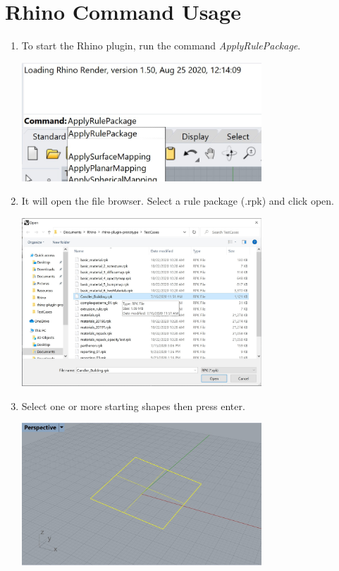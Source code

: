 \section{Rhino Command Usage}

\begin{enumerate}
    \item To start the Rhino plugin, run the command \textit{ApplyRulePackage}.\\
    \begin{minipage}{\linewidth}
        \centering
        \includegraphics[width=9cm]{res/man_rhino_cmd}
    \end{minipage}
    \item It will open the file browser. Select a rule package (.rpk) and click open.\\
    \begin{minipage}{\linewidth}
        \centering
        \includegraphics[width=9cm]{res/man_rhino_rpk_browser}
    \end{minipage}
    \item Select one or more starting shapes then press enter.\\
    \begin{minipage}{\linewidth}
        \centering
        \includegraphics[width=9cm]{res/man_rhino_pick_shape}

\end{minipage}
\end{enumerate}
